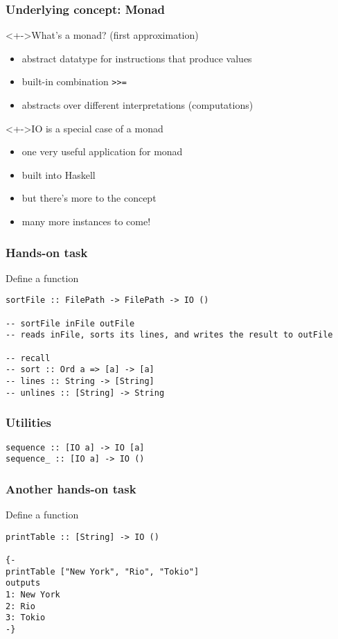 \documentclass{beamer}
\begin{document}
\begin{frame}
  \frametitle{Underlying concept: \textbf{Monad}}

  \begin{block}<+->{What's a monad? (first approximation)}
    \begin{itemize}
    \item abstract datatype for instructions that produce values
    \item built-in combination \texttt{>>=}
    \item abstracts over different interpretations (computations)
    \end{itemize}
  \end{block}
  \begin{alertblock}<+->{IO is a special case of a monad}
    \begin{itemize}
    \item one very useful application for monad
    \item built into Haskell
    \item but there's more to the concept
    \item many more instances to come!
    \end{itemize}
  \end{alertblock}
\end{frame}
\begin{frame}[fragile]
  \frametitle{Hands-on task}
  Define a function
\begin{lstlisting}
sortFile :: FilePath -> FilePath -> IO ()

-- sortFile inFile outFile 
-- reads inFile, sorts its lines, and writes the result to outFile

-- recall
-- sort :: Ord a => [a] -> [a]
-- lines :: String -> [String]
-- unlines :: [String] -> String
\end{lstlisting}
\end{frame}
\begin{frame}[fragile]
  \frametitle{Utilities}
\begin{lstlisting}
sequence :: [IO a] -> IO [a]
sequence_ :: [IO a] -> IO ()
\end{lstlisting}
\end{frame}
\begin{frame}[fragile]
  \frametitle{Another hands-on task}
  Define a function
\begin{lstlisting}
printTable :: [String] -> IO ()

{-
printTable ["New York", "Rio", "Tokio"]
outputs
1: New York
2: Rio
3: Tokio
-} 
\end{lstlisting}
\end{frame}
\end{document}
